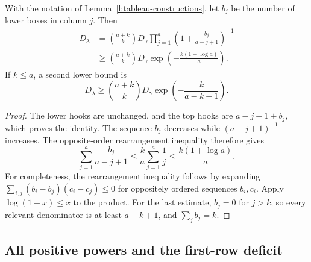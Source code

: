 \begin{lemma}\label{l:degree-hook-ratio}
With the notation of Lemma~\ref{l:tableau-constructions}, let $b_j$
be the number of lower boxes in column $j$.  Then
\begin{align}
 D_\lambda
 &=\binom{a+k}{k}D_\gamma
       \prod_{j=1}^a\left(1+\frac{b_j}{a-j+1}\right)^{-1}
       \label{l:hook-exact}\\
 &\ge\binom{a+k}{k}D_\gamma
       \exp\left(-\frac{k(1+\log a)}a\right).
       \label{l:hook-rearrangement}
\end{align}
If $k\le a$, a second lower bound is
\begin{equation}\label{l:hook-short-tail}
 D_\lambda\ge\binom{a+k}{k}D_\gamma
                \exp\left(-\frac{k}{a-k+1}\right).
\end{equation}
\end{lemma}
\begin{proof}
The lower hooks are unchanged, and the top hooks are $a-j+1+b_j$,
which proves the identity.  The sequence $b_j$ decreases while
$(a-j+1)^{-1}$ increases.  The opposite-order rearrangement inequality
therefore gives
\[
 \sum_{j=1}^a\frac{b_j}{a-j+1}
 \le\frac{k}{a}\sum_{j=1}^a\frac1j
 \le\frac{k(1+\log a)}a.
\]
For completeness, the rearrangement inequality follows by expanding
$\sum_{i,j}(b_i-b_j)(c_i-c_j)\le0$ for oppositely ordered
sequences $b_i,c_i$.  Apply $\log(1+x)\le x$ to the product.
For the last estimate, $b_j=0$ for $j>k$, so every relevant
denominator is at least $a-k+1$, and $\sum_jb_j=k$.
\end{proof}

\subsection{All positive powers and the first-row deficit}

